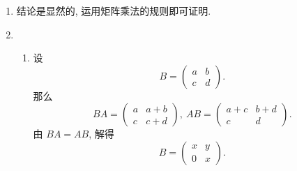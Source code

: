 \documentclass[a4paper, 11pt]{ctexart}
\begin{document}
\begin{enumerate}
\begin{proof}
\begin{align*}
\begin{array}{cccc}
                    \end{array}
                \right)
                +
                \left(
                    \begin{array}{cccc}
                        0 & \cdots & \dfrac{a_{1n}-a_{n1}}{2} \\
                        \vdots &  & \vdots \\
                        -\dfrac{a_{1n}-a_{n1}}{2} & \cdots & 0
                    \end{array}
                \right). \qedhere 
            \end{align*}
        \end{proof}
    \item %
        结论是显然的, 运用矩阵乘法的规则即可证明.
    \item %
        \begin{enumerate}[(1)]
            \item %
                设
                \[
                    B =
                    \left(
                        \begin{array}{cccc}
                            a & b \\
                            c & d
                        \end{array}
                    \right).    
                \]
                那么
                \[
                    BA =
                    \left(
                        \begin{array}{cccc}
                            a & a+b \\
                            c & c+d
                        \end{array}
                    \right),\ 
                    AB =
                    \left(
                        \begin{array}{cccc}
                            a+c & b+d \\
                            c & d
                        \end{array}
                    \right).
                \]
                由 $BA = AB$, 解得
                \[
                    B =
                    \left(
                        \begin{array}{cccc}
                            x & y \\
                            0 & x
                        \end{array}
                    \right).
                \]

\end{enumerate}
\end{enumerate}
\end{document}
